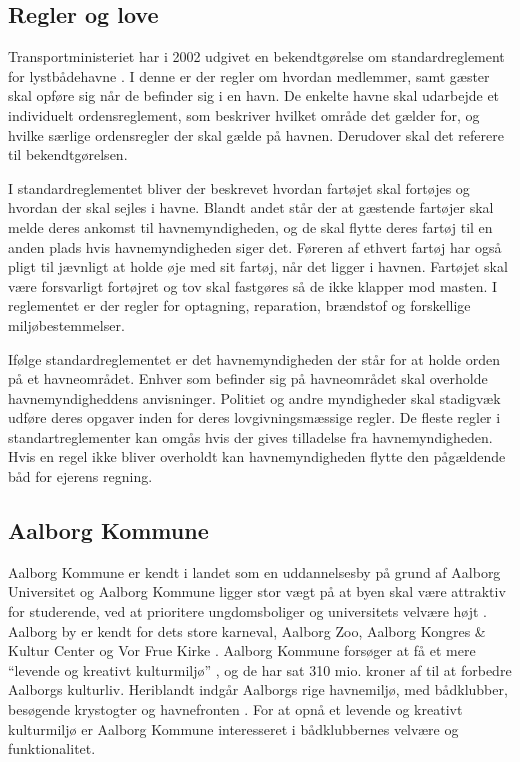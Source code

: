 \subsection{Regler og love}
Transportministeriet har i 2002 udgivet en bekendtgørelse om standardreglement for lystbådehavne \cite{standardreglement}. I denne er der regler om hvordan medlemmer, samt gæster skal opføre sig når de befinder sig i en havn. De enkelte havne skal udarbejde et individuelt ordensreglement, som beskriver hvilket område det gælder for, og hvilke særlige ordensregler der skal gælde på havnen. Derudover skal det referere til bekendtgørelsen.

I standardreglementet bliver der beskrevet hvordan fartøjet skal fortøjes og hvordan der skal sejles i havne. Blandt andet står der at gæstende fartøjer skal melde deres ankomst til havnemyndigheden, og de skal flytte deres fartøj til en anden plads hvis havnemyndigheden siger det. Føreren af ethvert fartøj har også pligt til jævnligt at holde øje med sit fartøj, når det ligger i havnen. Fartøjet skal være forsvarligt fortøjret og tov skal fastgøres så de ikke klapper mod masten. I reglementet er der regler for optagning, reparation, brændstof og forskellige miljøbestemmelser.

Ifølge standardreglementet er det havnemyndigheden der står for at holde orden på et havneområdet. Enhver som befinder sig på havneområdet skal overholde havnemyndigheddens anvisninger. Politiet og andre myndigheder skal stadigvæk udføre deres opgaver inden for deres lovgivningsmæssige regler. De fleste regler i standartreglementer kan omgås hvis der gives tilladelse fra havnemyndigheden. Hvis en regel ikke bliver overholdt kan havnemyndigheden flytte den pågældende båd for ejerens regning.


\subsection{Aalborg Kommune}
Aalborg Kommune er kendt i landet som en uddannelsesby på grund af Aalborg Universitet og Aalborg Kommune ligger stor vægt på at byen skal være attraktiv for studerende, ved at prioritere ungdomsboliger og universitets velvære højt \cite{udd-strat-aalborg} . Aalborg by er kendt for dets store karneval, Aalborg Zoo, Aalborg Kongres \& Kultur Center og Vor Frue Kirke \cite{AalborgAttraktioner} . Aalborg Kommune forsøger at få et mere “levende og kreativt kulturmiljø” \cite{AalborgSatserPaaKultur}, og de har sat 310 mio. kroner af til at forbedre Aalborgs kulturliv. Heriblandt indgår Aalborgs rige havnemiljø, med bådklubber, besøgende krystogter og havnefronten \cite{AalborgHavnefront} . For at opnå et levende og kreativt kulturmiljø er Aalborg Kommune interesseret i bådklubbernes velvære og funktionalitet.
